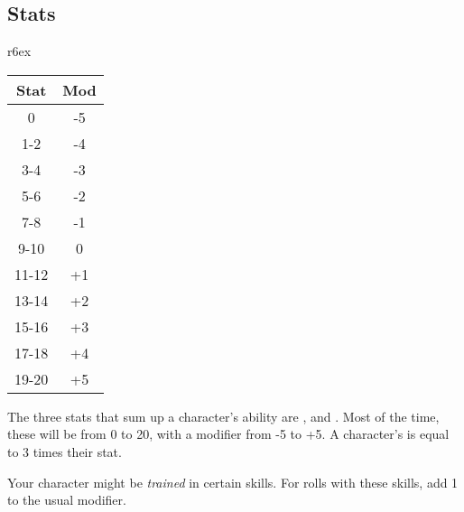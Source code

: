 
\subsection{Stats}

\begin{wraptable}[9]{r}{6ex}
  \small
\vspace*{-8ex}
\hspace*{-4.5ex}
\begin{tabular}{cc}
  Stat  & Mod \\
  \hline
  0     & -5       \\
  1-2   & -4       \\
  3-4   & -3       \\
  5-6   & -2       \\
  7-8   & -1       \\
  9-10  &  0       \\
  11-12 & +1       \\
  13-14 & +2       \\
  15-16 & +3       \\
  17-18 & +4       \\
  19-20 & +5
\end{tabular}
\end{wraptable}

The three stats that sum up a character's ability are ,  and . Most of the time, these will be from 0 to 20, with a modifier from -5 to +5. A character's  is equal to 3 times their  stat.

Your character might be \emph{trained} in certain skills. For rolls with these skills, add 1 to the usual modifier.
